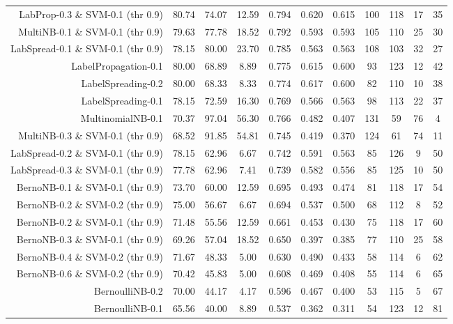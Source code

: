 \begin{table}[!htb]
\begin{tabular}{r|c|c|c|c|c|c|c|c|c|c}
LabProp-0.3 \& SVM-0.1 (thr 0.9) & 80.74 & 74.07 & 12.59 & 0.794 & 0.620 & 0.615 & 100 & 118 & 17 & 35 \\ 
MultiNB-0.1 \& SVM-0.1 (thr 0.9) & 79.63 & 77.78 & 18.52 & 0.792 & 0.593 & 0.593 & 105 & 110 & 25 & 30 \\ 
LabSpread-0.1 \& SVM-0.1 (thr 0.9) & 78.15 & 80.00 & 23.70 & 0.785 & 0.563 & 0.563 & 108 & 103 & 32 & 27 \\ 
LabelPropagation-0.1 & 80.00 & 68.89 & 8.89 & 0.775 & 0.615 & 0.600 & 93 & 123 & 12 & 42 \\ 
LabelSpreading-0.2 & 80.00 & 68.33 & 8.33 & 0.774 & 0.617 & 0.600 & 82 & 110 & 10 & 38 \\ 
LabelSpreading-0.1 & 78.15 & 72.59 & 16.30 & 0.769 & 0.566 & 0.563 & 98 & 113 & 22 & 37 \\ 
MultinomialNB-0.1 & 70.37 & 97.04 & 56.30 & 0.766 & 0.482 & 0.407 & 131 & 59 & 76 & 4 \\ 
MultiNB-0.3 \& SVM-0.1 (thr 0.9) & 68.52 & 91.85 & 54.81 & 0.745 & 0.419 & 0.370 & 124 & 61 & 74 & 11 \\ 
LabSpread-0.2 \& SVM-0.1 (thr 0.9) & 78.15 & 62.96 & 6.67 & 0.742 & 0.591 & 0.563 & 85 & 126 & 9 & 50 \\ 
LabSpread-0.3 \& SVM-0.1 (thr 0.9) & 77.78 & 62.96 & 7.41 & 0.739 & 0.582 & 0.556 & 85 & 125 & 10 & 50 \\ 
BernoNB-0.1 \& SVM-0.1 (thr 0.9) & 73.70 & 60.00 & 12.59 & 0.695 & 0.493 & 0.474 & 81 & 118 & 17 & 54 \\ 
BernoNB-0.2 \& SVM-0.2 (thr 0.9) & 75.00 & 56.67 & 6.67 & 0.694 & 0.537 & 0.500 & 68 & 112 & 8 & 52 \\ 
BernoNB-0.2 \& SVM-0.1 (thr 0.9) & 71.48 & 55.56 & 12.59 & 0.661 & 0.453 & 0.430 & 75 & 118 & 17 & 60 \\ 
BernoNB-0.3 \& SVM-0.1 (thr 0.9) & 69.26 & 57.04 & 18.52 & 0.650 & 0.397 & 0.385 & 77 & 110 & 25 & 58 \\ 
BernoNB-0.4 \& SVM-0.2 (thr 0.9) & 71.67 & 48.33 & 5.00 & 0.630 & 0.490 & 0.433 & 58 & 114 & 6 & 62 \\ 
BernoNB-0.6 \& SVM-0.2 (thr 0.9) & 70.42 & 45.83 & 5.00 & 0.608 & 0.469 & 0.408 & 55 & 114 & 6 & 65 \\ 
BernoulliNB-0.2 & 70.00 & 44.17 & 4.17 & 0.596 & 0.467 & 0.400 & 53 & 115 & 5 & 67 \\ 
BernoulliNB-0.1 & 65.56 & 40.00 & 8.89 & 0.537 & 0.362 & 0.311 & 54 & 123 & 12 & 81 \\ 
\hline\hline
\end{tabular}
\end{table}
